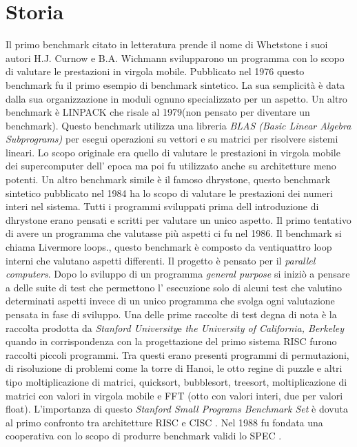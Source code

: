 \documentclass[12pt,a4paper]{report}
\begin{document}
\section{Storia}
Il primo benchmark citato in letteratura prende il nome di Whetstone i suoi autori H.J. Curnow e B.A. Wichmann svilupparono un programma con lo scopo di valutare le prestazioni in virgola mobile.  Pubblicato nel 1976 questo benchmark fu il primo esempio di benchmark sintetico. La sua semplicità è data dalla sua organizzazione in moduli ognuno specializzato per un aspetto.
    Un altro benchmark è LINPACK che risale al 1979(non pensato per diventare un benchmark). Questo benchmark utilizza una libreria \textit{BLAS (Basic Linear Algebra Subprograms) } per esegui operazioni su vettori e su matrici per risolvere sistemi lineari. Lo scopo originale era quello di valutare le prestazioni in virgola mobile dei supercomputer dell' epoca ma poi fu utilizzato anche su architetture meno potenti\cite{LinpackSite}.
    Un altro benchmark simile è il famoso dhrystone, questo benchmark sintetico pubblicato nel 1984 ha lo scopo di valutare le prestazioni dei numeri interi nel sistema\cite{DhrystoneWP}.
    Tutti i programmi sviluppati prima dell introduzione di dhrystone erano pensati e scritti per valutare un unico aspetto. Il primo tentativo di avere un programma che valutasse più aspetti ci fu nel 1986. Il benchmark si chiama Livermore loops., questo benchmark  è composto da ventiquattro loop interni che valutano aspetti differenti. Il progetto è pensato per il \textit{parallel computers}\cite{LivermoreInfo}. 
    Dopo lo sviluppo di un programma \textit{general purpose} si iniziò a pensare a delle suite di test che permettono l' esecuzione solo di alcuni test che valutino determinati aspetti invece di un unico programma che svolga ogni valutazione pensata in fase di sviluppo.
Una delle prime raccolte di test degna di nota è la raccolta prodotta da \textit{Stanford University}e \textit{the University of California,  Berkeley} quando in corrispondenza con la progettazione del primo sistema RISC furono raccolti piccoli programmi. Tra questi erano presenti programmi  di permutazioni,  di risoluzione di problemi come la torre di Hanoi,  le otto regine di puzzle e altri tipo moltiplicazione di matrici, quicksort,  bubblesort, treesort, moltiplicazione di matrici con valori in virgola mobile e FFT (otto con valori interi, due per valori float).  L'importanza di questo \textit{Stanford Small Programs Benchmark Set} è dovuta al primo confronto tra architetture RISC e CISC \cite{CommonBench}.
    Nel 1988 fu fondata una cooperativa con lo scopo di produrre benchmark validi lo SPEC \cite{SPECSite}.%
\end{document}
